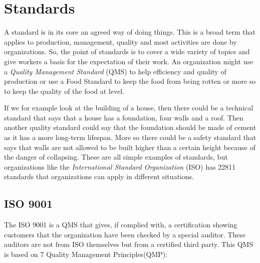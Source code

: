 \section{Standards}
A standard is in its core an agreed way of doing things. This is a broad term that applies to production, management, quality and most activities are done by organizations. So, the point of standards is to cover a wide variety of topics and give workers a basis for the expectation of their work. An organization might use a \textit{Quality Management Standard} (QMS) to help efficiency and quality of production or use a Food Standard to keep the food from being rotten or more so to keep the quality of the food at level.

If we for example look at the building of a house, then there could be a technical standard that says that a house has a foundation, four walls and a roof. Then another quality standard could say that the foundation should be made of cement as it has a more long-term lifespan. More so there could be a safety standard that says that walls are not allowed to be built higher than a certain height because of the danger of collapsing. These are all simple examples of standards, but organizations like the \textit{International Standard Organization} (ISO) has 22811 standards that organizations can apply in different situations.
\subsection{ISO 9001}
The ISO 9001 is a QMS that gives, if complied with, a certification showing customers that the organization have been checked by a special auditor. These auditors are not from ISO themselves but from a certified third party.
This QMS is based on 7 Quality Management Principles(QMP):

